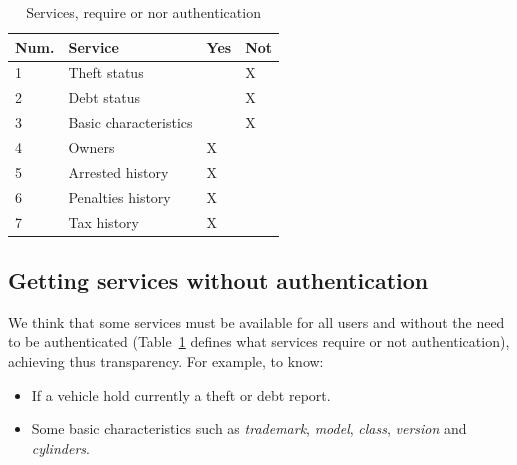\begin{table}[htb]
\footnotesize
    \begin{center}
    \caption{Services, require or nor authentication }
    \label{table:servicesPermits}
        \begin{tabular}{l|l|l|l}
			\textbf{Num.}&\textbf{Service}		 &Yes    &Not    \\ \hline
             1			 &Theft status           &       &X      \\ \hline
             2			 &Debt status            &       &X       \\ \hline
             3			 &Basic characteristics  &       &X       \\ \hline
             4			 &Owners                 &X      &       \\ \hline
             5			 &Arrested history       &X      &       \\ \hline
             6			 &Penalties history      &X      &       \\ \hline
             7			 &Tax history            &X      &       \\ \hline
        \end{tabular}
    \end{center}
\end{table}


\subsection{Getting services without authentication}
\label{ssec:getServNoAuth}
We think that some services must be available for all users and without the need to be 
authenticated 
(Table~\ref{table:servicesPermits} defines what services require or not authentication), 
achieving thus transparency. 
For example, to know:
\begin{itemize}
    \item If a vehicle hold currently a theft or debt report.
    \item Some basic characteristics such as \textit{trademark}, \textit{model}, 
        \textit{class}, \textit{version} and \textit{cylinders}.
\end{itemize}


